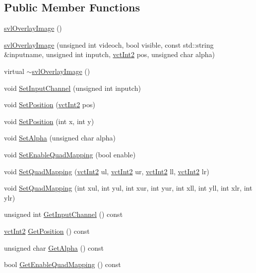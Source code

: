 \subsection*{Public Member Functions}
\begin{DoxyCompactItemize}
\item 
\hyperlink{classsvl_overlay_image_aadceba5bd71c27bb6a632789673e003e}{svl\-Overlay\-Image} ()
\item 
\hyperlink{classsvl_overlay_image_a6956a988cbeae9213ae0520086a23559}{svl\-Overlay\-Image} (unsigned int videoch, bool visible, const std\-::string \&inputname, unsigned int inputch, \hyperlink{vct_fixed_size_vector_types_8h_add8c88eb6a432b15f14b866b9c35325f}{vct\-Int2} pos, unsigned char alpha)
\item 
virtual \hyperlink{classsvl_overlay_image_aa1e16ea8f0f2c80efdd3341b2a338416}{$\sim$svl\-Overlay\-Image} ()
\item 
void \hyperlink{classsvl_overlay_image_a06c65bd1c863ed671e49006e423651ef}{Set\-Input\-Channel} (unsigned int inputch)
\item 
void \hyperlink{classsvl_overlay_image_af9eec05637c4c9ce2682927c9621596b}{Set\-Position} (\hyperlink{vct_fixed_size_vector_types_8h_add8c88eb6a432b15f14b866b9c35325f}{vct\-Int2} pos)
\item 
void \hyperlink{classsvl_overlay_image_ab5139e999681e0700ca3d2125116fe33}{Set\-Position} (int x, int y)
\item 
void \hyperlink{classsvl_overlay_image_a32c2a6442350329c2da5bd6fca8508fa}{Set\-Alpha} (unsigned char alpha)
\item 
void \hyperlink{classsvl_overlay_image_acc8324b4242f126bb79984f4c44debbd}{Set\-Enable\-Quad\-Mapping} (bool enable)
\item 
void \hyperlink{classsvl_overlay_image_a0b2eea4c2d5efff893d56e0c6101b251}{Set\-Quad\-Mapping} (\hyperlink{vct_fixed_size_vector_types_8h_add8c88eb6a432b15f14b866b9c35325f}{vct\-Int2} ul, \hyperlink{vct_fixed_size_vector_types_8h_add8c88eb6a432b15f14b866b9c35325f}{vct\-Int2} ur, \hyperlink{vct_fixed_size_vector_types_8h_add8c88eb6a432b15f14b866b9c35325f}{vct\-Int2} ll, \hyperlink{vct_fixed_size_vector_types_8h_add8c88eb6a432b15f14b866b9c35325f}{vct\-Int2} lr)
\item 
void \hyperlink{classsvl_overlay_image_a94280006554b1e3a5c0cb7190306bb1d}{Set\-Quad\-Mapping} (int xul, int yul, int xur, int yur, int xll, int yll, int xlr, int ylr)
\item 
unsigned int \hyperlink{classsvl_overlay_image_af84067f5472b9543c716fefda47aa954}{Get\-Input\-Channel} () const 
\item 
\hyperlink{vct_fixed_size_vector_types_8h_add8c88eb6a432b15f14b866b9c35325f}{vct\-Int2} \hyperlink{classsvl_overlay_image_a73fe36ec044c12e09a4556db4ccf8953}{Get\-Position} () const 
\item 
unsigned char \hyperlink{classsvl_overlay_image_a9c76c4ef1071e27a5653136091d51a2e}{Get\-Alpha} () const 
\item 
bool \hyperlink{classsvl_overlay_image_aaf3a1c081f90608c0927c5433fe6df24}{Get\-Enable\-Quad\-Mapping} () const 
\end{DoxyCompactItemize}
